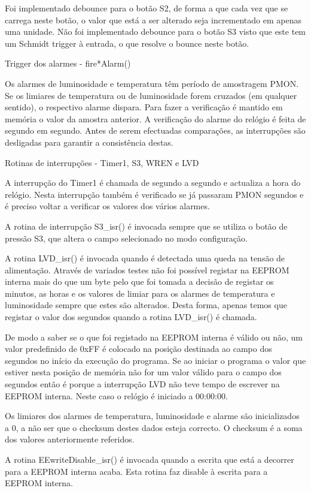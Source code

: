 \documentclass[a4paper,12pt]{article}
\begin{document}
Foi implementado debounce para o botão S2, de forma a que cada vez que se carrega neste botão, o valor que está a ser alterado seja incrementado em apenas uma unidade. Não foi implementado debounce para o botão S3 visto que este tem um Schmidt trigger à entrada, o que resolve o bounce neste botão.

Trigger dos alarmes - fire*Alarm()

Os alarmes de luminosidade e temperatura têm período de amostragem PMON. Se os limiares de temperatura ou de luminosidade forem cruzados (em qualquer sentido), o respectivo alarme dispara. Para fazer a verificação é mantido em memória o valor da amostra anterior.
A verificação do alarme do relógio é feita de segundo em segundo. Antes de serem efectuadas comparações, as interrupções são desligadas para garantir a consistência destas.

Rotinas de interrupções - Timer1, S3, WREN e LVD

A interrupção do Timer1 é chamada de segundo a segundo e actualiza a hora do relógio. Nesta interrupção também é verificado se já passaram PMON segundos e é preciso voltar a verificar os valores dos vários alarmes.

A rotina de interrupção S3_isr() é invocada sempre que se utiliza o botão de pressão S3, que altera o campo selecionado no modo configuração.

A rotina LVD_isr() é invocada quando é detectada uma queda na tensão de alimentação. Através de variados testes não foi possível registar na EEPROM interna mais do que um byte pelo que foi tomada a decisão de registar os minutos, as horas e os valores de limiar para os alarmes de temperatura e luminosidade sempre que estes são alterados. Desta forma, apenas temos que registar o valor dos segundos quando a rotina LVD_isr() é chamada.

De modo a saber se o que foi registado na EEPROM interna é válido ou não, um valor predefinido de 0xFF é colocado na posição destinada ao campo dos segundos no início da execução do programa. Se ao iniciar o programa o valor que estiver nesta posição de memória não for um valor válido para o campo dos segundos então é porque a interrupção LVD não teve tempo de escrever na EEPROM interna. Neste caso o relógio é iniciado a 00:00:00.

Os limiares dos alarmes de temperatura, luminosidade e alarme são inicializados a 0, a não ser que o checksum destes dados esteja correcto. O checksum é a soma dos valores anteriormente referidos.

A rotina EEwriteDisable_isr() é invocada quando a escrita que está a decorrer para a EEPROM interna acaba. Esta rotina faz disable à escrita para a EEPROM interna.
\end{document}
